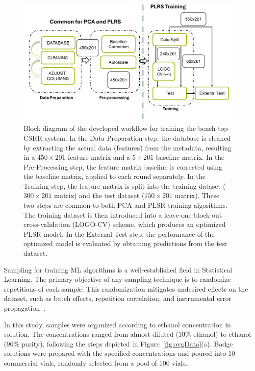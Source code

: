 \documentclass[journal,twoside,web]{ieeecolor}
\begin{document}
\begin{figure}[!t]
	\centering
	\includegraphics [trim = 0mm 0mm 0mm 0mm, clip, width=1.5\columnwidth]{figures/fig6_3.png}
	\caption{Block diagram of the developed workflow for training the bench-top CSRR system. In the Data Preparation step, the database is cleaned by extracting the actual data (features) from the metadata, resulting in a $450 \times 201$ feature matrix and a $5 \times 201$ baseline matrix. In the Pre-Processing step, the feature matrix baseline is corrected using the baseline matrix, applied to each round separately. In the Training step, the feature matrix is split into the training dataset ($300 \times 201$ matrix) and the test dataset ($150 \times 201$ matrix). These two steps are common to both PCA and PLSR training algorithms. The training dataset is then introduced into a leave-one-block-out cross-validation (LOGO-CV) scheme, which produces an optimized PLSR model. In the External Test step, the performance of the optimized model is evaluated by obtaining predictions from the test dataset.}
	\label{fig:workflow}
	\vspace{-0.3cm}
\end{figure}

Sampling for training ML algorithms is a well-established field in Statistical Learning. The primary objective of any sampling technique is to randomize repetitions of each sample. This randomization mitigates undesired effects on the dataset, such as batch effects, repetition correlation, and instrumental error propagation~\cite{Wu2020}. 

In this study, samples were organized according to ethanol concentration in solution. The concentrations ranged from almost diluted ($10\%$ ethanol) to ethanol ($96\%$ purity), following the steps depicted in Figure~\ref{fig:avgData}(a). Badge solutions were prepared with the specified concentrations and poured into 10 commercial vials, randomly selected from a pool of 100 vials.
\end{document}
